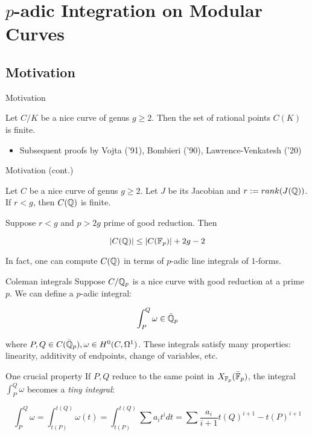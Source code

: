 \section{$p$-adic Integration on Modular Curves}

\subsection{Motivation}

\begin{frame}{Motivation}
\begin{theorem}[Faltings '83]
Let $C/K$ be a nice curve of genus $g \geq 2$. Then the set of rational points $C(K)$ is finite.
\end{theorem}
\begin{itemize}
\item Subsequent proofs by Vojta ('91), Bombieri ('90), Lawrence-Venkatesh ('20)
\end{itemize}
\end{frame}

\begin{frame}{Motivation (cont.)}
\begin{theorem}[Chabauty '41]
Let $C$ be a nice curve of genus $g \geq 2$. Let $J$ be its Jacobian and $r:= rank(J(\mathbb{Q}))$. If $r < g$, then $C(\mathbb{Q})$ is finite.
\end{theorem}

\begin{theorem}[Coleman '85]
Suppose $r < g$ and $p > 2g$ prime of good reduction. Then

\[
|C(\mathbb{Q})| \leq |C(\mathbb{F}_p)| + 2g -2 
\]

In fact, one can compute $C(\mathbb{Q})$ in terms of $p$-adic line integrals of $1$-forms.
\end{theorem}
\end{frame}

\begin{frame}{Coleman integrals}
Suppose $C/\mathbb{Q}_p$ is a nice curve with good reduction at a prime $p$. We can define a $p$-adic integral:

\[
\int_P^Q \omega \in \bar{\mathbb{Q}}_p
\]

where $P,Q \in C(\bar{\mathbb{Q}}_p), \omega \in H^0(C, \Omega^1)$. These integrals satisfy many properties: linearity, additivity of endpoints, change of variables, etc.
\end{frame}

\begin{frame}{One crucial property}
If $P,Q$ reduce to the same point in $X_{\mathbb{F}_p}(\bar{\mathbb{F}}_p)$, the integral $\int_P^Q \omega$ becomes a \textit{tiny integral}:

\[
\int_P^Q \omega = \int_{t(P)}^{t(Q)} \omega(t) = \int_{t(P)}^{t(Q)} \sum a_i t^i dt = \sum \frac{a_i}{i+1} t(Q)^{i+1} - t(P)^{i+1}
\]
\end{frame}


